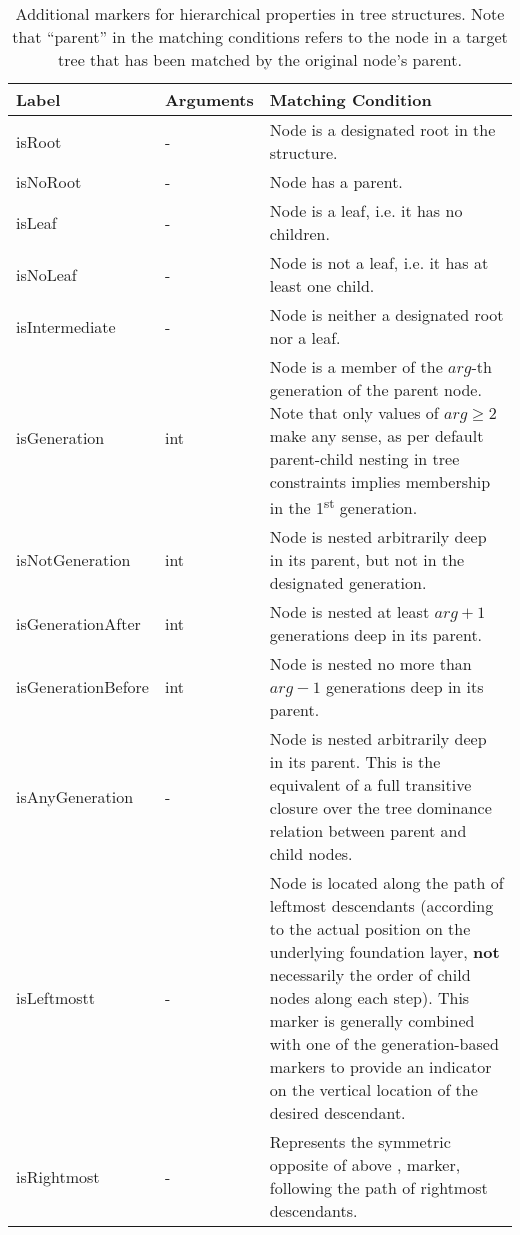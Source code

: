 \documentclass[11pt,a4paper]{report}
\begin{document}
\begin{table}[!htb]\centering
\begin{tabular}{|p{}|p{}|p{}|}
	\hline 
	\textbf{Label} & \textbf{Arguments} & \textbf{Matching Condition} \\ 
	\hline 
	\hline  
	isRoot & - & Node is a designated root in the structure. \\ 
	\hline 
	isNoRoot & - & Node has a parent. \\ 
	\hline 
	isLeaf & - & Node is a leaf, i.e. it has no children. \\  
	\hline 
	isNoLeaf & - & Node is not a leaf, i.e. it has at least one child. \\  
	\hline 
	isIntermediate & - & Node is neither a designated root nor a leaf. \\  
	\hline 
	isGeneration & int & Node is a member of the $arg$-th generation of the parent node. Note that only values of $arg \geq 2$ make any sense, as per default parent-child nesting in tree constraints implies membership in the 1\textsuperscript{st} generation. \\  
	\hline
	isNotGeneration & int & Node is nested arbitrarily deep in its parent, but not in the designated generation. \\  
	\hline  
	isGenerationAfter & int & Node is nested at least $arg+1$ generations deep in its parent. \\  
	\hline 
	isGenerationBefore & int & Node is nested no more than $arg-1$ generations deep in its parent. \\  
	\hline 
	isAnyGeneration & - & Node is nested arbitrarily deep in its parent. This is the equivalent of a full transitive closure over the tree dominance relation between parent and child nodes. \\  
	\hline 
	isLeftmostt & - & Node is located along the path of leftmost descendants (according to the actual position on the underlying foundation layer, \textbf{not} necessarily the order of child nodes along each step). This marker is generally combined with one of the generation-based markers to provide an indicator on the vertical location of the desired descendant. \\  
	\hline 
	isRightmost & - & Represents the symmetric opposite of above \query{isLeftmost}, marker, following the path of rightmost descendants. \\  
	\hline 
\end{tabular}
\caption[Hierarchical markers]{Additional markers for hierarchical properties in tree structures. Note that ``parent'' in the matching conditions refers to the node in a target tree that has been matched by the original node's parent.}
\label{tab:tree-hierarchy-markers}
\end{table}
\end{document}

